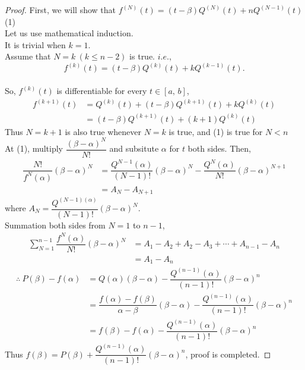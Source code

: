 \documentclass[12pt]{book}
\theoremstyle{definition}
\begin{document}
		\begin{proof}
			First, we will show that $f^{(N)}(t)=(t-\beta)Q^{(N)}(t)+nQ^{(N-1)}(t)$\dotfill (1)\\
			Let us use mathematical induction.\\
			It is trivial when $k=1$.\\
			Assume that $N=k\ (k\leq n-2)$ is true. $i.e.$, $$f^{(k)}(t)=(t-\beta)Q^{(k)}(t)+kQ^{(k-1)}(t).$$\\
			So, $f^{(k)}(t)$ is differentiable for every $t\in[a,\,b]$,
			\begin{align*}
				f^{(k+1)}(t)&=Q^{(k)}(t)+(t-\beta)Q^{(k+1)}(t)+kQ^{(k)}(t)\\
				&=(t-\beta)Q^{(k+1)}(t)+(k+1)Q^{(k)}(t)
			\end{align*}
			Thus $N=k+1$ is also true whenever $N=k$ is true, and (1) is true for $N<n$\\
			At (1), multiply $\dfrac{(\beta-\alpha)^N}{N!}$ and subsitute $\alpha$ for $t$ both sides. Then,\\
			\begin{align}
				\dfrac{N!}{f^{N}(\alpha)}(\beta-\alpha)^N&=\dfrac{Q^{N-1}(\alpha)}{(N-1)!}(\beta-\alpha)^N-\dfrac{Q^{N}(\alpha)}{N!}(\beta-\alpha)^{N+1}\nonumber\\
				&=A_N-A_{N+1}\tag{2}
			\end{align}
			where $A_N=\dfrac{Q^{(N-1)(\alpha)}}{(N-1)!}(\beta-\alpha)^N.$\\
			Summation both sides from $N=1$ to $n-1$, \begin{align*}
				\displaystyle\sum_{N=1}^{n-1} \dfrac{f^{N}(\alpha)}{N!}(\beta-\alpha)^N&=A_1-A_2+A_2-A_3+\cdots+A_{n-1}-A_n\\
				&=A_1-A_n
			\end{align*}
			\begin{align*}
				\therefore~P(\beta)-f(\alpha)&=Q(\alpha)(\beta-\alpha)-\dfrac{Q^{(n-1)}(\alpha)}{(n-1)!}(\beta-\alpha)^n\\
				&=\dfrac{f(\alpha)-f(\beta)}{\alpha-\beta}(\beta-\alpha)-\dfrac{Q^{(n-1)}(\alpha)}{(n-1)!}(\beta-\alpha)^n\\
				&=f(\beta)-f(\alpha)-\dfrac{Q^{(n-1)}(\alpha)}{(n-1)!}(\beta-\alpha)^n
			\end{align*}
			Thus $f(\beta)=P(\beta)+\dfrac{Q^{(n-1)}(\alpha)}{(n-1)!}(\beta-\alpha)^n$, proof is completed.
		\end{proof}
		\newpage
\end{document}
